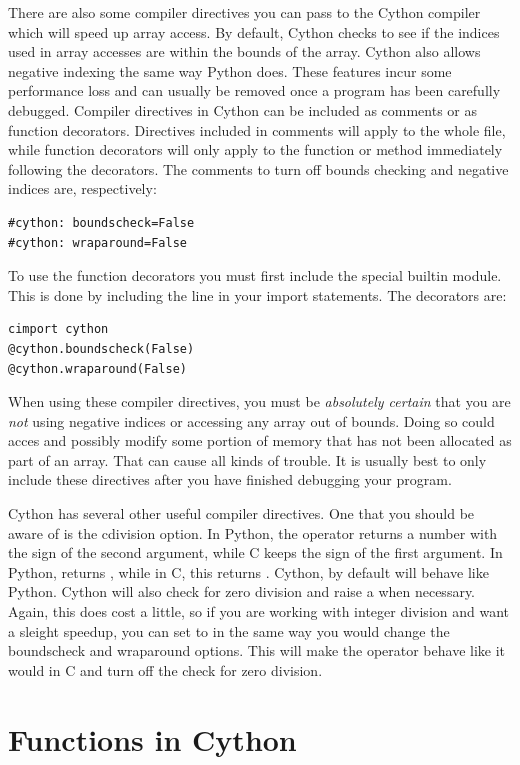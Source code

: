 There are also some compiler directives you can pass to the Cython compiler which will speed up array access.
By default, Cython checks to see if the indices used in array accesses are within the bounds of the array.
Cython also allows negative indexing the same way Python does.
These features incur some performance loss and can usually be removed once a program has been carefully debugged.
Compiler directives in Cython can be included as comments or as function decorators.
Directives included in comments will apply to the whole file, while function decorators will only apply to the function or method immediately following the decorators.
The comments to turn off bounds checking and negative indices are, respectively:
\begin{lstlisting}
#cython: boundscheck=False
#cython: wraparound=False
\end{lstlisting}
To use the function decorators you must first include the special builtin  module.
This is done by including the line  in your import statements.
The decorators are:
\begin{lstlisting}
cimport cython
@cython.boundscheck(False)
@cython.wraparound(False)
\end{lstlisting}
When using these compiler directives, you must be \emph{absolutely certain} that you are \emph{not} using negative indices or accessing any array out of bounds.
Doing so could acces and possibly modify some portion of memory that has not been allocated as part of an array.
That can cause all kinds of trouble.
It is usually best to only include these directives after you have finished debugging your program.

Cython has several other useful compiler directives.
One that you should be aware of is the cdivision option.
In Python, the \li{\%} operator returns a number with the sign of the second argument, while C keeps the sign of the first argument.
In Python,  returns , while in C, this returns .
Cython, by default will behave like Python.
Cython will also check for zero division and raise a  when necessary.
Again, this does cost a little, so if you are working with integer division and want a sleight speedup, you can set  to  in the same way you would change the boundscheck and wraparound options.
This will make the \li{\%} operator behave like it would in C and turn off the check for zero division.

\section*{Functions in Cython}

